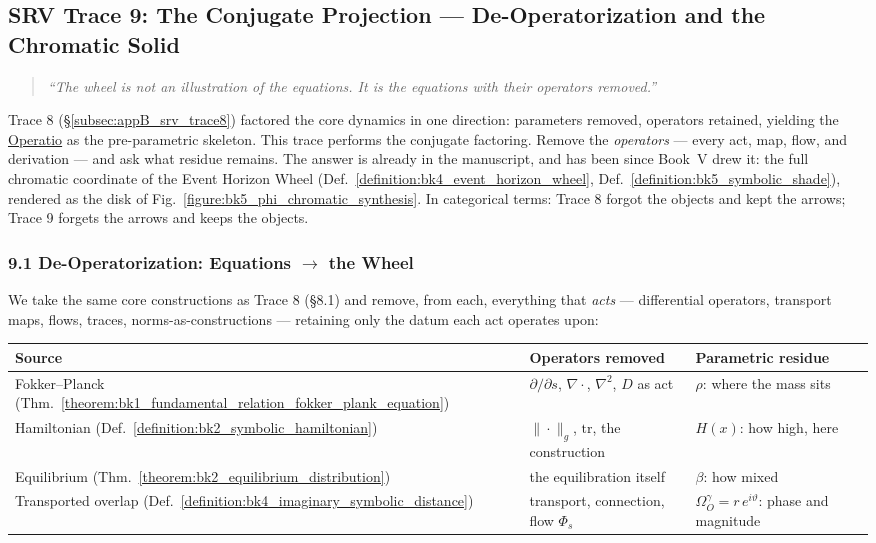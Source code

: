 \subsection*{SRV Trace 9: The Conjugate Projection --- De-Operatorization and the Chromatic Solid}
\label{subsec:appB_srv_trace9}

\begin{quote}
\emph{``The wheel is not an illustration of the equations.
It is the equations with their operators removed.''}
\end{quote}

\noindent
Trace 8 (\S\ref{subsec:appB_srv_trace8}) factored the core dynamics in one
direction: parameters removed, operators retained, yielding the
\hyperref[sec:bk1_operatio]{Operatio} as the pre-parametric skeleton. This
trace performs the conjugate factoring. Remove the \emph{operators} ---
every act, map, flow, and derivation --- and ask what residue remains.
The answer is already in the manuscript, and has been since Book~V drew it:
the full chromatic coordinate of the Event Horizon Wheel
(Def.~\ref{definition:bk4_event_horizon_wheel},
Def.~\ref{definition:bk5_symbolic_shade}), rendered as the disk of
Fig.~\ref{figure:bk5_phi_chromatic_synthesis}. In categorical terms: Trace 8
forgot the objects and kept the arrows; Trace 9 forgets the arrows and keeps
the objects.

\subsubsection*{9.1 De-Operatorization: Equations $\to$ the Wheel}

We take the same core constructions as Trace 8 (\S8.1) and remove, from each,
everything that \emph{acts} --- differential operators, transport maps, flows,
traces, norms-as-constructions --- retaining only the datum each act operates
upon:

\begin{center}
\renewcommand{\arraystretch}{1.3}
\begin{tabularx}{\textwidth}{@{}lYY@{}}
\toprule
\textbf{Source} & \textbf{Operators removed} & \textbf{Parametric residue} \\
\midrule
Fokker--Planck (Thm.~\ref{theorem:bk1_fundamental_relation_fokker_plank_equation})
& $\partial/\partial s$, $\nabla\!\cdot$, $\nabla^2$, $D$ as act
& $\rho$: where the mass sits \\
Hamiltonian (Def.~\ref{definition:bk2_symbolic_hamiltonian})
& $\|\cdot\|_g$, $\mathrm{tr}$, the construction
& $H(x)$: how high, here \\
Equilibrium (Thm.~\ref{theorem:bk2_equilibrium_distribution})
& the equilibration itself
& $\beta$: how mixed \\
Transported overlap (Def.~\ref{definition:bk4_imaginary_symbolic_distance})
& transport, connection, flow $\Phi_s$
& $\Omega_O^\gamma = r\,e^{i\vartheta}$: phase and magnitude \\
\bottomrule
\end{tabularx}
\end{center}

